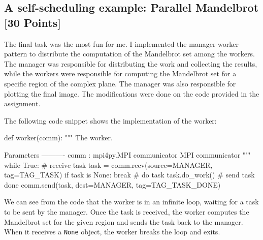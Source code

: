 \documentclass[unicode,11pt,a4paper,oneside,numbers=endperiod,openany]{scrartcl}
\begin{document}
\subsection{A self-scheduling example: Parallel Mandelbrot [30 Points]}
The final task was the most fun for me. I implemented the manager-worker pattern
to distribute the computation of the Mandelbrot set among the workers. The
manager was responsible for distributing the work and collecting the results,
while the workers were responsible for computing the Mandelbrot set for a
specific region of the complex plane. The manager was also responsible for
plotting the final image. The modifications were done on the code provided in
the assignment.

The following code snippet shows the implementation of the worker:
\begin{pythonverbatim}
def worker(comm):
"""
The worker.

Parameters
----------
comm : mpi4py.MPI communicator
    MPI communicator
"""
while True:
    # receive task
    task = comm.recv(source=MANAGER, tag=TAG_TASK)
    if task is None:
        break
    # do task
    task.do_work()
    # send task done
    comm.send(task, dest=MANAGER, tag=TAG_TASK_DONE)
\end{pythonverbatim}
We can see from the code that the worker is in an infinite loop, waiting for a
task to be sent by the manager. Once the task is received, the worker computes
the Mandelbrot set for the given region and sends the task back to the manager.
When it receives a \texttt{None} object, the worker breaks the loop and exits.
\end{document}

